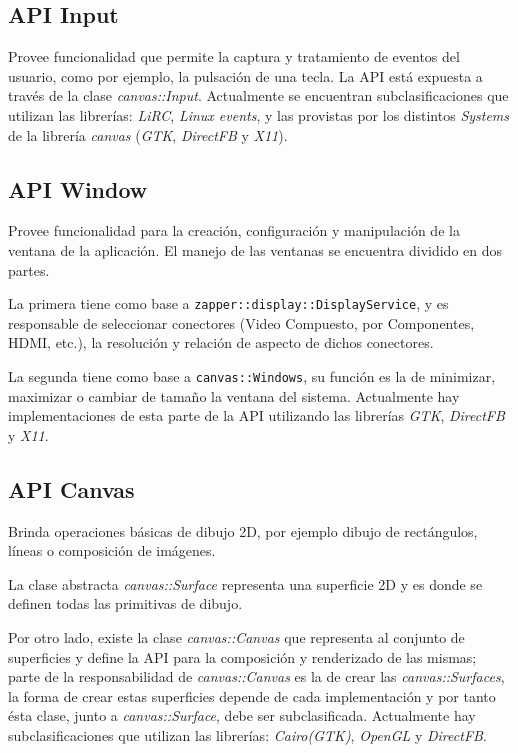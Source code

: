 \subsection{API Input}
Provee funcionalidad que permite la captura y tratamiento de eventos del usuario, como por ejemplo, la pulsación de una tecla. La API está expuesta a través de la clase \textit{canvas::Input}. Actualmente se encuentran subclasificaciones que utilizan las librerías: \textit{LiRC}, \textit{Linux events}, y las provistas por los distintos \textit{Systems} de la librería \textit{canvas} (\textit{GTK}, \textit{DirectFB} y \textit{X11}).

\subsection{API Window}
Provee funcionalidad para la creación, configuración y manipulación de la ventana de la aplicación. El manejo de las ventanas se encuentra dividido en dos partes.

La primera tiene como base a \texttt{zapper::display::DisplayService}, y es responsable de seleccionar conectores (Video Compuesto, por Componentes, HDMI, etc.), la resolución y relación de aspecto de dichos conectores.

La segunda tiene como base a \texttt{canvas::Windows}, su función es la de minimizar, maximizar o cambiar de tamaño la ventana del sistema. Actualmente hay implementaciones de esta parte de la API utilizando las librerías \textit{GTK}, \textit{DirectFB} y \textit{X11}.

\subsection{API Canvas}
Brinda operaciones básicas de dibujo 2D, por ejemplo dibujo de rectángulos, líneas o  composición de imágenes. 

La clase abstracta \textit{canvas::Surface} representa una superficie 2D y es donde se definen todas las primitivas de dibujo. 

Por otro lado, existe la clase \textit{canvas::Canvas} que representa al conjunto de superficies y define la API para la composición y renderizado de las mismas; parte de la responsabilidad de \textit{canvas::Canvas} es la de crear las \textit{canvas::Surfaces}, la forma de crear estas superficies depende de cada implementación y por tanto ésta clase, junto a \textit{canvas::Surface}, debe ser subclasificada. Actualmente hay subclasificaciones que utilizan las librerías: \textit{Cairo(GTK)}, \textit{OpenGL} y \textit{DirectFB}.

